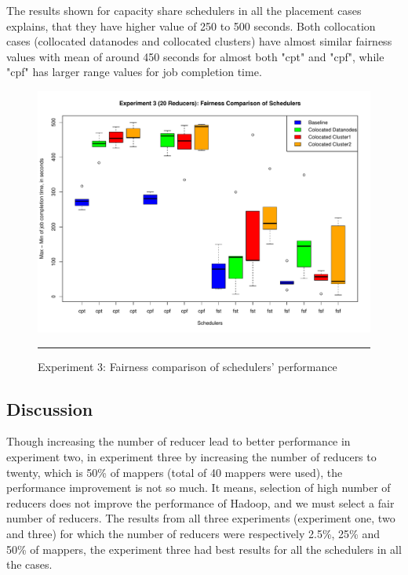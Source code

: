  The results shown for capacity share schedulers in all the placement cases explains, that they have higher value of 250 to 500 seconds. Both collocation cases (collocated datanodes and collocated clusters) have almost similar fairness values with mean of around 450 seconds for almost both "cpt" and "cpf", while "cpf" has larger range values for job completion time.  
 
 
  

\begin{figure}[htbp]
  \centering
    \includegraphics[width=\textwidth,height=\textheight,keepaspectratio]{./Figures/exp_3_max-min.pdf}
    \rule{35em}{0.5pt}
  \caption{Experiment 3: Fairness comparison of schedulers' performance }
  \label{fig:exp_3_max-min}
\end{figure}

\subsection{Discussion}
Though increasing the number of reducer lead to better performance in experiment two, in experiment three by increasing the number of reducers to twenty, which is 50\% of mappers (total of 40 mappers were used), the performance improvement is not so much. It means, selection of high number of reducers does not improve the performance of Hadoop, and we must select a fair number of reducers. The results from all three experiments (experiment one, two and three) for which the number of reducers were respectively 2.5\%, 25\% and 50\% of mappers, the experiment three had best results for all the schedulers in all the cases.\\


